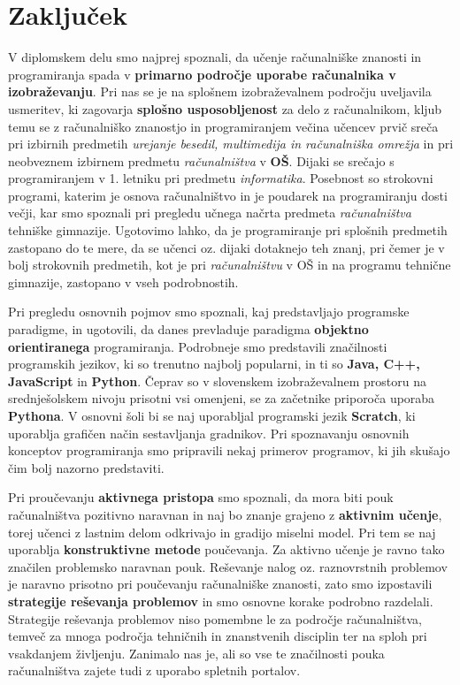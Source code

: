 \section{Zaključek}
\label{sec:zakljuek}

V diplomskem delu smo najprej spoznali, da učenje računalniške
znanosti in programiranja spada v \textbf{primarno področje uporabe
  računalnika v izobraževanju}. Pri nas se je na splošnem
izobraževalnem področju uveljavila usmeritev, ki zagovarja
\textbf{splošno usposobljenost} za delo z računalnikom, kljub temu se
z računalniško znanostjo in programiranjem večina učencev prvič
sreča pri izbirnih predmetih \emph{urejanje besedil, multimedija in
  računalniška omrežja} in pri neobveznem izbirnem predmetu
\emph{računalništva} v \textbf{OŠ}. Dijaki se srečajo s programiranjem
v 1. letniku pri predmetu \emph{informatika}. Posebnost so strokovni
programi, katerim je osnova računalništvo in je poudarek na
programiranju dosti večji, kar smo spoznali pri pregledu učnega načrta
predmeta \emph{računalništva} tehniške gimnazije. Ugotovimo lahko, da
je programiranje pri splošnih predmetih zastopano do te mere, da se
učenci oz. dijaki dotaknejo teh znanj, pri čemer je v bolj strokovnih
predmetih, kot je pri \emph{računalništvu} v OŠ in na programu tehnične
gimnazije, zastopano v vseh podrobnostih.

Pri pregledu osnovnih pojmov smo spoznali, kaj predstavljajo programske
paradigme, in ugotovili, da danes prevladuje paradigma \textbf{objektno
  orientiranega} programiranja. Podrobneje smo predstavili značilnosti
programskih jezikov, ki so trenutno najbolj popularni, in ti so
\textbf{Java, C++, JavaScript} in \textbf{Python}. Čeprav so v
slovenskem izobraževalnem prostoru na srednješolskem nivoju prisotni
vsi omenjeni, se za začetnike priporoča uporaba \textbf{Pythona}. V
osnovni šoli bi se naj uporabljal programski jezik \textbf{Scratch},
ki uporablja grafičen način sestavljanja gradnikov. Pri spoznavanju
osnovnih konceptov programiranja smo pripravili nekaj primerov
programov, ki jih skušajo čim bolj nazorno predstaviti.

Pri proučevanju \textbf{aktivnega pristopa} smo spoznali, da mora biti pouk
računalništva pozitivno naravnan in naj bo znanje grajeno z
\textbf{aktivnim učenje}, torej učenci z lastnim delom odkrivajo in
gradijo miselni model. Pri tem se naj uporablja
\textbf{konstruktivne metode} poučevanja. Za aktivno učenje je ravno
tako značilen problemsko naravnan pouk. Reševanje nalog
oz. raznovrstnih problemov je naravno prisotno pri poučevanju
računalniške znanosti, zato smo izpostavili \textbf{strategije
  reševanja problemov} in smo osnovne korake podrobno
razdelali. Strategije reševanja problemov niso pomembne le za področje
računalništva, temveč za mnoga področja tehničnih in znanstvenih
disciplin ter na sploh pri vsakdanjem življenju. Zanimalo nas je, ali so
vse te značilnosti pouka računalništva zajete tudi z uporabo spletnih
portalov.

